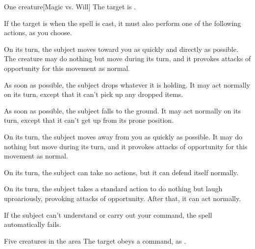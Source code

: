 \spellrng{\rngmed}
\begin{spelltarget}{One creature}[Magic vs. Will]
    \spellsuccess The target is \bewildered.
    
    If the target is \bloodied when the spell is cast, it must also perform one of the following actions, as you choose.
    \par {} On its turn, the subject moves toward you as quickly and directly as possible. The creature may do nothing but move during its turn, and it provokes attacks of opportunity for this movement as normal.
    \par {} As soon as possible, the subject drops whatever it is holding. It may act normally on its turn, except that it can't pick up any dropped items.
    \par {} As soon as possible, the subject falls to the ground. It may act normally on its turn, except that it can't get up from its prone position.
    \par {} On its turn, the subject moves away from you as quickly as possible. It may do nothing but move during its turn, and it provokes attacks of opportunity for this movement as normal.
    \par {} On its turn, the subject can take no actions, but it can defend itself normally.
    \par {} On its turn, the subject takes a standard action to do nothing but laugh uproariously, provoking attacks of opportunity. After that, it can act normally.
\end{spelltarget}
\spellnotes If the subject can't understand or carry out your command, the spell automatically fails.

\spellrng{\rngmed}
\begin{spelltarget}{Five creatures in the area}
    \spellsuccess The target obeys a command, as .
\end{spelltarget}

